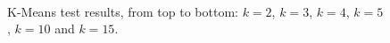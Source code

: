 \documentclass[10pt, conference]{IEEEtran}
\begin{document}
    \begin{figure}[t]
        \centering
        \\
        \caption{K-Means test results, from top to bottom: $k=2$, $k=3$, $k=4$, $k=5$, $k=10$ and $k=15$.}
        \label{fig:kmeans}
    \end{figure}
\end{document}
